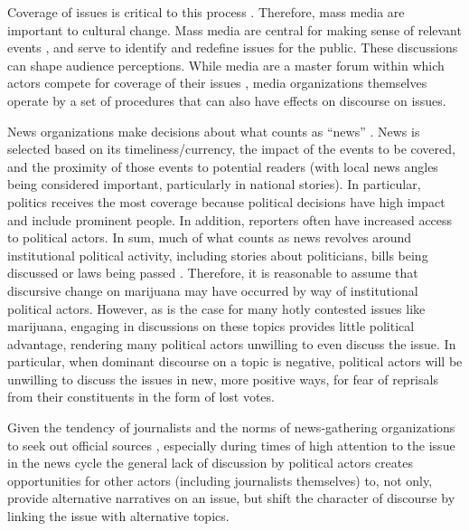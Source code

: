 Coverage of issues is critical to this process \citep{amenta_et_al_2009,ferree_et_al_2002}. Therefore, mass media are important to cultural change. Mass media are central for making sense of relevant events \citep{gamson_and_modigliani_1989}, and serve to identify and redefine issues for the public. These discussions can shape audience perceptions. While media are a master forum within which actors compete for coverage of their issues \citep{amenta_et_al_2012}, media organizations themselves operate by a set of procedures that can also have effects on discourse on issues. 


News organizations make decisions about what counts as ``news'' \citep{galtung_and_ruge_1965}. News is selected based on its timeliness/currency, the impact of the events to be covered, and the proximity of those events to potential readers (with local news angles being considered important, particularly in national stories). In particular, politics receives the most coverage because political decisions have high impact and include prominent people. In addition, reporters often have increased access to political actors. In sum, much of what counts as news revolves around institutional political activity, including stories about politicians, bills being discussed or laws being passed \citep{amenta_et_al_2012}. Therefore, it is reasonable to assume that discursive change on marijuana may have occurred by way of institutional political actors. However, as is the case for many hotly contested issues like marijuana, engaging in discussions on these topics provides little political advantage, rendering many political actors unwilling to even discuss the issue. In particular, when dominant discourse on a topic is negative, political actors will be unwilling to discuss the issues in new, more positive ways, for fear of reprisals from their constituents in the form of lost votes. 

Given the tendency of journalists and the norms of news-gathering organizations to seek out official sources \citep{schudson_2002,gitlin_1980,gans_1979}, especially during times of high attention to the issue in the news cycle \citep{baumgartner_and_jones_1993} the general lack of discussion by political actors creates opportunities for other actors (including journalists themselves) to, not only, provide alternative narratives on an issue, but shift the character of discourse by linking the issue with alternative topics. 



